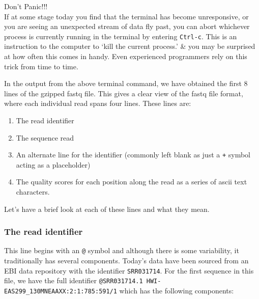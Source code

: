\begin{warning}
\large{Don't Panic!!!} \\
\normalsize
If at some stage today you find that the terminal has become unresponsive, or you are seeing an unexpected stream of data fly past, you can abort whichever process is currently running in the terminal by entering \texttt{Ctrl-c}.
This is an instruction to the computer to `kill the current process.' \& you may be surprised at how often this comes in handy.
Even experienced programmers rely on this trick from time to time.
\end{warning}

\begin{note}
In the output from the above terminal command, we have obtained the first 8 lines of the gzipped fastq file.
This gives a clear view of the fastq file format, where each individual read spans four lines.
These lines are:
\begin{enumerate}
\item The read identifier
\item The sequence read
\item An alternate line for the identifier (commonly left blank as just a \texttt{+} symbol acting as a placeholder)
\item The quality scores for each position along the read as a series of ascii text characters.
\end{enumerate}
\end{note}

Let's have a brief look at each of these lines and what they mean.\\

\subsubsection*{The read identifier}
This line begins with an \texttt{@} symbol and although there is some variability, it traditionally has several components.
Today's data have been sourced from an EBI data repository with the identifier \texttt{SRR031714}.
For the first sequence in this file, we have the full identifier \texttt{@SRR031714.1 HWI-EAS299\_130MNEAAXX:2:1:785:591/1} which has the following components: \\

